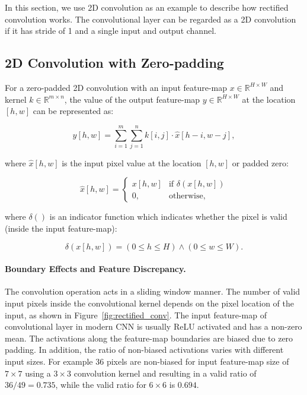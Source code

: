 

In this section, we use 2D convolution as an example to describe how rectified convolution works. The convolutional layer can be regarded as a 2D convolution if it has stride of 1 and a single input and output channel.

\subsection{2D Convolution with Zero-padding}

For a zero-padded 2D convolution with an input feature-map $x\in\mathbb{R}^{H\times W}$ and kernel $k\in\mathbb{R}^{m\times n}$, the value of the output feature-map $y\in\mathbb{R}^{H\times W}$ at the location $[h, w]$ can be represented as: 

\begin{equation}
    y[h, w]=\sum_{i=1}^m\sum_{j=1}^n k[i, j] \cdot \hat{x}[h-i, w-j] ,
\end{equation}

where $\hat{x}[h, w]$ is the input pixel value at the location $[h, w]$ or padded zero:

\begin{equation}
    \hat{x}[h, w]=
    \begin{cases}
        x[h, w] & \text{if } \delta(x[h, w])\\
        0, & \text{otherwise} ,
    \end{cases}
\end{equation}

where $\delta()$ is an indicator function which indicates whether the pixel is valid (inside the input feature-map):

\begin{equation}
    \delta(x[h, w]) = (0\le h \le H) \land (0 \le w \le W). 
\end{equation}


\paragraph{Boundary Effects and Feature Discrepancy.}

The convolution operation acts in a sliding window manner. The number of valid input pixels inside the convolutional kernel depends on the pixel location of the input, as shown in Figure~\ref{fig:rectified_conv}. 
The input feature-map of convolutional layer in modern CNN is usually ReLU activated and has a non-zero mean. 
The activations along the feature-map boundaries are biased due to zero padding. 
In addition, the ratio of non-biased activations varies with different input sizes. For example 36 pixels are non-biased for input feature-map size of $7\times7$ using a $3\times3$ convolution kernel and resulting in a valid ratio of $36/49=0.735$, while the valid ratio for $6\times6$ is $0.694$. 

